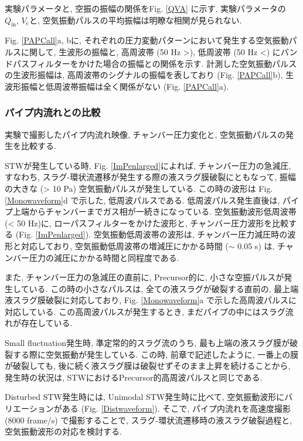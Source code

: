 \documentclass[12pt]{article}
\begin{document}
実験パラメータと, 空振の振幅の関係をFig. \ref{QVA} に示す. 実験パラメータの $Q_\mathrm{in}$, $V_\mathrm{c}$と, 空気振動パルスの平均振幅は明瞭な相関が見られない. 

Fig. \ref{PAPCall}a, bに, それぞれの圧力変動パターンにおいて発生する空気振動パルスに関して, 生波形の振幅と, 高周波帯 (50 Hz >), 低周波帯 (50 Hz <) にバンドパスフィルターをかけた場合の振幅との関係を示す. 計測した空気振動パルスの生波形振幅は, 高周波帯のシグナルの振幅を表しており (Fig. \ref{PAPCall}b), 生波形振幅と低周波帯振幅は全く関係がない (Fig. \ref{PAPCall}a). 





\clearpage
\subsubsection{パイプ内流れとの比較}
実験で撮影したパイプ内流れ映像, チャンバー圧力変化と, 空気振動パルスの発生を比較する.

STWが発生している時, Fig. \ref{ImPenlarged}によれば, チャンバー圧力の急減圧, すなわち, スラグ-環状流遷移が発生する際の液スラグ膜破裂にともなって, 振幅の大きな (> 10 Pa) 空気振動パルスが発生している. 
この時の波形は Fig. \ref{Monowaveform}d で示した, 低周波パルスである. 低周波パルス発生直後は, パイプ上端からチャンバーまでガス相が一続きになっている.
空気振動波形低周波帯 (< 50 Hz)に, ローパスフィルターをかけた波形と, チャンバー圧力波形を比較する (Fig. \ref{ImPenlarged}). 空気振動低周波帯の波形は, チャンバー圧力減圧時の波形と対応しており, 空気振動低周波帯の増減圧にかかる時間 ($\sim$ 0.05 s) は, チャンバー圧力の減圧にかかる時間と同程度である.

また, チャンバー圧力の急減圧の直前に, Precursor的に, 小さな空振パルスが発生している. この時の小さなパルスは, 全ての液スラグが破裂する直前の, 最上端液スラグ膜破裂に対応しており, Fig. \ref{Monowaveform}a で示した高周波パルスに対応している. この高周波パルスが発生するとき, まだパイプの中にはスラグ流れが存在している. 

Small fluctuation発生時, 準定常的的スラグ流のうち, 最も上端の液スラグ膜が破裂する際に空気振動が発生している. この時, 前章で記述したように, 一番上の膜が破裂しても, 後に続く液スラグ膜は破裂せずそのまま上昇を続けることから, 発生時の状況は, STWにおけるPrecursor的高周波パルスと同じである.

Disturbed STW発生時には, Unimodal STW発生時に比べて, 空気振動波形にバリエーションがある (Fig. \ref{Distwaveform}). そこで, パイプ内流れを高速度撮影 (8000 frame/s) で撮影することで, スラグ-環状流遷移時の液スラグ破裂過程と, 空気振動波形の対応を検討する.
\end{document}
